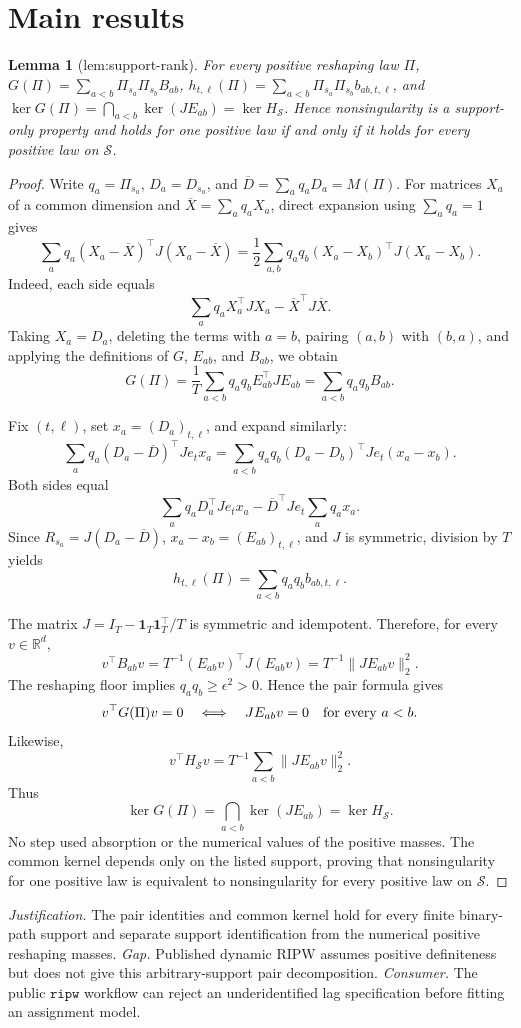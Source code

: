 \documentclass{article}
\newtheorem{lemma}{Lemma}
\begin{document}
\section{Main results}

\begin{lemma}[lem:support-rank]\label{lem:support-rank}
For every positive reshaping law \(\Pi\), \(G(\Pi)=\sum_{a<b}\Pi_{s_a}\Pi_{s_b}B_{ab}\), \(h_{t,\ell}(\Pi)=\sum_{a<b}\Pi_{s_a}\Pi_{s_b}b_{ab,t,\ell}\), and \(\ker G(\Pi)=\bigcap_{a<b}\ker(JE_{ab})=\ker H_{\mathcal S}\). Hence nonsingularity is a support-only property and holds for one positive law if and only if it holds for every positive law on \(\mathcal S\).
\end{lemma}
\begin{proof}
Write \(q_a=\Pi_{s_a}\), \(D_a=D_{s_a}\), and \(\overline D=\sum_aq_aD_a=M(\Pi)\).  For matrices \(X_a\) of a common dimension and \(\overline X=\sum_aq_aX_a\), direct expansion using \(\sum_aq_a=1\) gives
\[
 \sum_aq_a(X_a-\overline X)^{\top}J(X_a-\overline X)
 =\frac12\sum_{a,b}q_aq_b(X_a-X_b)^{\top}J(X_a-X_b).
\]
Indeed, each side equals
\[
 \sum_aq_aX_a^{\top}JX_a-\overline X^{\top}J\overline X.
\]
Taking \(X_a=D_a\), deleting the terms with \(a=b\), pairing \((a,b)\) with \((b,a)\), and applying the definitions of \(G\), \(E_{ab}\), and \(B_{ab}\), we obtain
\[
 G(\Pi)=\frac1T\sum_{a<b}q_aq_bE_{ab}^{\top}JE_{ab}
 =\sum_{a<b}q_aq_bB_{ab}.
\]

Fix \((t,\ell)\), set \(x_a=(D_a)_{t,\ell}\), and expand similarly:
\[
 \sum_aq_a(D_a-\overline D)^{\top}Je_tx_a
 =\sum_{a<b}q_aq_b(D_a-D_b)^{\top}Je_t(x_a-x_b).
\]
Both sides equal
\[
 \sum_aq_aD_a^{\top}Je_tx_a-\overline D^{\top}Je_t\sum_aq_ax_a.
\]
Since \(R_{s_a}=J(D_a-\overline D)\), \(x_a-x_b=(E_{ab})_{t,\ell}\), and \(J\) is symmetric, division by \(T\) yields
\[
 h_{t,\ell}(\Pi)=\sum_{a<b}q_aq_bb_{ab,t,\ell}.
\]

The matrix \(J=I_T-\mathbf 1_T\mathbf 1_T^{\top}/T\) is symmetric and idempotent.  Therefore, for every \(v\in\mathbb R^d\),
\[
 v^{\top}B_{ab}v=T^{-1}(E_{ab}v)^{\top}J(E_{ab}v)
 =T^{-1}\lVert JE_{ab}v\rVert_2^2.
\]
The reshaping floor implies \(q_aq_b\geq\epsilon^2>0\).  Hence the pair formula gives
\[
 v^{\top}G(\Pi)v=0
 \quad\Longleftrightarrow\quad
 JE_{ab}v=0\quad\hbox{for every }a<b.
\]
Likewise,
\[
 v^{\top}H_{\mathcal S}v
 =T^{-1}\sum_{a<b}\lVert JE_{ab}v\rVert_2^2.
\]
Thus
\[
 \ker G(\Pi)=\bigcap_{a<b}\ker(JE_{ab})=\ker H_{\mathcal S}.
\]
No step used absorption or the numerical values of the positive masses.  The common kernel depends only on the listed support, proving that nonsingularity for one positive law is equivalent to nonsingularity for every positive law on \(\mathcal S\).
\end{proof}
\par\smallskip\noindent \textit{Justification.} The pair identities and common kernel hold for every finite binary-path support and separate support identification from the numerical positive reshaping masses. \textit{Gap.} Published dynamic RIPW assumes positive definiteness but does not give this arbitrary-support pair decomposition. \textit{Consumer.} The public \(\texttt{ripw}\) workflow can reject an underidentified lag specification before fitting an assignment model.
\end{document}
